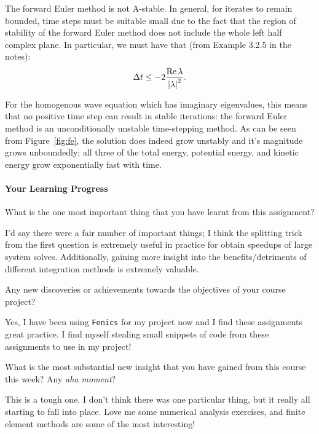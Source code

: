 \begin{solution}
The forward Euler method is not A-stable.
In general, for iterates to remain bounded, time steps must be suitable small due to the fact that the region of stability of the forward Euler method does not include the whole left half complex plane.
In particular, we must have that (from Example 3.2.5 in the notes): $$\Delta t \leq -2 \frac{\Re\lambda}{\abs{\lambda}^2}.$$

For the homogenous wave equation which has imaginary eigenvalues, this means that no positive time step can result in stable iterations: the forward Euler method is an unconditionally unstable time-stepping method.
As can be seen from Figure~\ref{fig:fe}, the solution does indeed grow unstably and it's magnitude grows unboundedly; all three of the total energy, potential energy, and kinetic energy grow exponentially fast with time.

\end{solution}

\vfill
\paragraph*{Your Learning Progress}%

What is the one most important thing that you have learnt from this assignment?

\vspace*{3mm}
I'd say there were a fair number of important things; I think the splitting trick from the first question is extremely useful in practice for obtain speedups of large system solves.
Additionally, gaining more insight into the benefits/detriments of different integration methods is extremely valuable.

\vspace*{8mm}

Any new discoveries or achievements towards the objectives of your course project?

\vspace*{3mm}
Yes, I have been using \texttt{Fenics} for my project now and I find these assignments great practice.
I find myself stealing small snippets of code from these assignments to use in my project!

\vspace*{8mm}

What is the most substantial new insight that you have gained from this course this week? Any \emph{aha moment}?

\vspace*{3mm}
This is a tough one. I don't think there was one particular thing, but it really all starting to fall into place.
Love me some numerical analysis exercises, and finite element methods are some of the most interesting!

